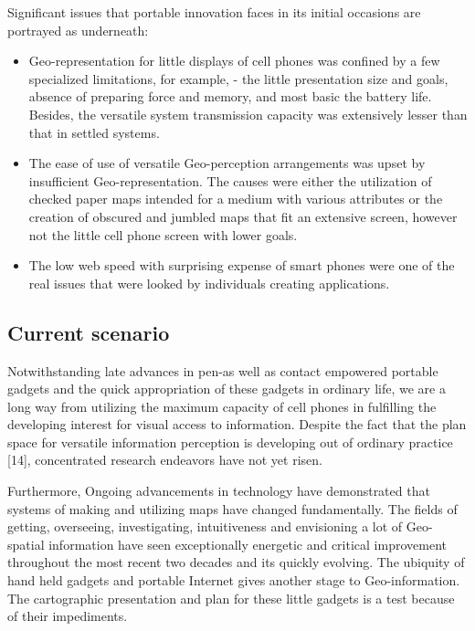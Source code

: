 Significant issues that portable innovation faces in its initial occasions are portrayed as underneath:

\begin{itemize}
  \item Geo-representation for little displays of cell phones was confined by a few specialized limitations, for example, - the little presentation size and goals, absence of preparing force and memory, and most basic the battery life. Besides, the versatile system transmission capacity was extensively lesser than that in settled systems.
  
  \item The ease of use of versatile Geo-perception arrangements was upset by insufficient Geo-representation. The causes were either the utilization of checked paper maps intended for a medium with various attributes or the creation of obscured and jumbled maps that fit an extensive screen, however not the little cell phone screen with lower goals.
  
  \item The low web speed with surprising expense of smart phones were one of the real issues that were looked by individuals creating applications.
\end{itemize}

\subsection{Current scenario}

Notwithstanding late advances in pen-as well as contact empowered portable gadgets and the quick appropriation of these gadgets in ordinary life, we are a long way from utilizing the maximum capacity of cell phones in fulfilling the developing interest for visual access to information. Despite the fact that the plan space for versatile  information perception is developing out of ordinary practice [14], concentrated research endeavors have not yet risen.

Furthermore, Ongoing advancements in technology have demonstrated that systems of making and utilizing maps have changed fundamentally. The fields of getting, overseeing, investigating, intuitiveness and envisioning a lot of Geo-spatial information have seen exceptionally energetic and critical improvement throughout the most recent two decades and its quickly evolving. The ubiquity of hand held gadgets and portable Internet gives another stage to Geo-information. The cartographic presentation and plan for these little gadgets is a test because of their impediments.

